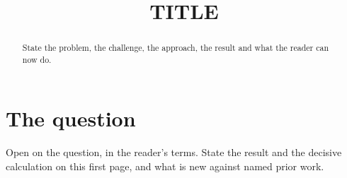 \documentclass[11pt]{article}
\title{ {{TITLE}} }
\author{}
\date{}
\begin{document}
\maketitle


\begin{abstract}
State the problem, the challenge, the approach, the result and what the reader can now do.
\end{abstract}

\tableofcontents

\section{The question}

Open on the question, in the reader's terms.
State the result and the decisive calculation on this first page, and what is new against named prior work.
\end{document}
